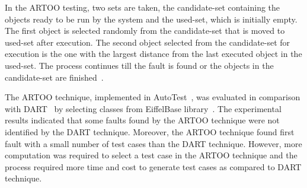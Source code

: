 In the ARTOO testing, two sets are taken, the candidate-set containing the objects ready to be run by the system and the used-set, which is initially empty. The first object is selected randomly from the candidate-set that is moved to used-set after execution. The second object selected from the candidate-set for execution is the one with the largest distance from the last executed object in the used-set. The process continues till the fault is found or the objects in the candidate-set are finished~\cite{ciupa2006object}.

The ARTOO technique, implemented in AutoTest~\cite{ciupa2008artoo}, was evaluated in comparison with DART~\cite{godefroid2005dart} by selecting classes from EiffelBase library~\cite{meyer1987eiffel}. The experimental results indicated that some faults found by the ARTOO technique were not identified by the DART technique. Moreover, the ARTOO technique found first fault with a small number of test cases than the DART technique. However, more computation was required to select a test case in the ARTOO technique and the process required more time and cost to generate test cases as compared to DART technique.


